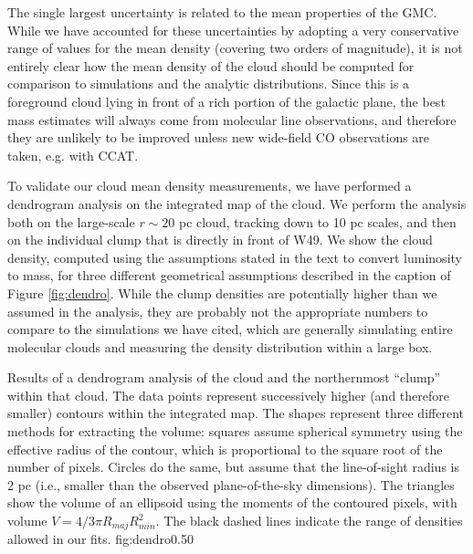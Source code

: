 The single largest uncertainty is related to the mean properties of the GMC.
While we have accounted for these uncertainties by adopting a very conservative
range of values for the mean density (covering two orders of magnitude), it is
not entirely clear how the mean density of the cloud should be computed for
comparison to simulations and the analytic distributions.  Since this is a
foreground cloud lying in front of a rich portion of the galactic plane, the
best mass estimates will always come from molecular line observations,
and therefore they are unlikely to be improved unless new wide-field CO
observations are taken, e.g. with CCAT.  

To validate our cloud mean density measurements, we have performed a dendrogram
analysis \citep{Rosolowsky2008c} on the integrated \thirteenco map of the
\GRSMC cloud.  We perform the analysis both on the large-scale $r\sim20$ pc
cloud, tracking down to 10 pc scales, and then on the individual clump that is
directly in front of W49.  We show the cloud density, computed using the
assumptions stated in the text to convert \thirteenco luminosity to mass, for
three different geometrical assumptions described in the caption of Figure
\ref{fig:dendro}.  While the clump densities are potentially higher than we
assumed in the analysis, they are probably not the appropriate numbers to
compare to the simulations we have cited, which are generally simulating entire
molecular clouds and measuring the density distribution within a large box.

{Results of a dendrogram analysis of the \GRSMC cloud and the
northernmost \thirteenco ``clump'' within that cloud.  The data points represent
successively higher (and therefore smaller) contours within the integrated \thirteenco
map.  The shapes represent three different methods
for extracting the volume: squares assume spherical symmetry using the
effective radius of the contour, which is proportional to the square root of
the number of pixels.  Circles do the same, but assume that the line-of-sight
radius is 2 pc (i.e., smaller than the observed plane-of-the-sky
dimensions).  The triangles show the volume of an ellipsoid using the moments of the
contoured pixels, with volume $V=4/3 \pi R_{maj}R_{min}^2$.  The black dashed lines
indicate the range of densities allowed in our fits.}
{fig:dendro}{0.5}{0}


